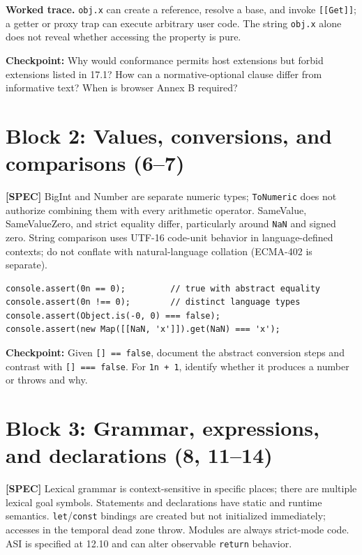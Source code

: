 \documentclass[11pt,letterpaper]{article}
\newcommand{\passthrough}[1]{#1}
\begin{document}
\textbf{Worked trace.} \passthrough{\lstinline!obj.x!} can create a reference, resolve a base, and invoke \passthrough{\lstinline![[Get]]!}; a getter or proxy trap can execute arbitrary user code. The string \passthrough{\lstinline!obj.x!} alone does not reveal whether accessing the property is pure.

\textbf{Checkpoint:} Why would conformance permits host extensions but forbid extensions listed in 17.1? How can a normative-optional clause differ from informative text? When is browser Annex B required?

\section{Block 2: Values, conversions, and comparisons (6--7)}\label{block-2-values-conversions-and-comparisons-67}

\textbf{{[}SPEC{]}} BigInt and Number are separate numeric types; \passthrough{\lstinline!ToNumeric!} does not authorize combining them with every arithmetic operator. SameValue, SameValueZero, and strict equality differ, particularly around \passthrough{\lstinline!NaN!} and signed zero. String comparison uses UTF-16 code-unit behavior in language-defined contexts; do not conflate with natural-language collation (ECMA-402 is separate).

\begin{lstlisting}
console.assert(0n == 0);         // true with abstract equality
console.assert(0n !== 0);        // distinct language types
console.assert(Object.is(-0, 0) === false);
console.assert(new Map([[NaN, 'x']]).get(NaN) === 'x');
\end{lstlisting}

\textbf{Checkpoint:} Given \passthrough{\lstinline![] == false!}, document the abstract conversion steps and contrast with \passthrough{\lstinline![] === false!}. For \passthrough{\lstinline!1n + 1!}, identify whether it produces a number or throws and why.

\section{Block 3: Grammar, expressions, and declarations (8, 11--14)}\label{block-3-grammar-expressions-and-declarations-8-1114}

\textbf{{[}SPEC{]}} Lexical grammar is context-sensitive in specific places; there are multiple lexical goal symbols. Statements and declarations have static and runtime semantics. \passthrough{\lstinline!let!}/\passthrough{\lstinline!const!} bindings are created but not initialized immediately; accesses in the temporal dead zone throw. Modules are always strict-mode code. ASI is specified at 12.10 and can alter observable \passthrough{\lstinline!return!} behavior.
\end{document}
